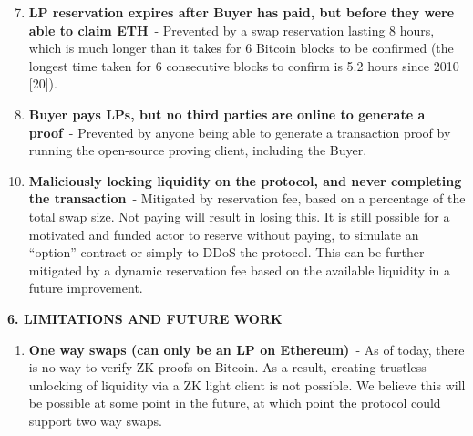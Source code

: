 \documentclass[
]{article}
\providecommand{\tightlist}{%
  \setlength{\itemsep}{0pt}\setlength{\parskip}{0pt}}
\begin{document}
{{\begin{enumerate}
\setcounter{enumi}{6}
\tightlist
\item
  \textbf{LP reservation expires after Buyer has paid, but before they were
  able to claim ETH}{~- Prevented by a swap reservation lasting 8 hours,
  which is much longer than it takes for 6 Bitcoin blocks to be
  confirmed (the longest time taken for 6 consecutive blocks to confirm
  is 5.2 hours since 2010 {[}20{]}). }
\end{enumerate}

{}

\begin{enumerate}
\setcounter{enumi}{7}
\tightlist
\item
  \textbf{Buyer pays LPs, but no third parties are online to generate a
  proof}{~- Prevented by anyone being able to generate a transaction
  proof by running the open-source proving client, including the Buyer.}
\end{enumerate}

{}

\begin{enumerate}
\setcounter{enumi}{9}
\tightlist
\item
  \textbf{Maliciously locking liquidity on the protocol, and never completing
  the transaction}{~- Mitigated by reservation fee, based on a
  percentage of the total swap size. Not paying will result in losing
  this. It is still possible for a motivated and funded actor to reserve
  without paying, to simulate an ``option'' contract or simply to DDoS
  the protocol. This can be further mitigated by a dynamic reservation
  fee based on the available liquidity in a future improvement.}
\end{enumerate}

{}


{}{}\vspace*{\baselineskip}
\begin{center}
\textbf{6. LIMITATIONS AND FUTURE WORK}
\end{center}

{}{}\vspace*{\baselineskip}

{}

\hspace*{3em}{There are several limitations and subsequent improvements that can be made to the protocol in future iterations:}
{}{}\vspace*{\baselineskip}

{}

\begin{enumerate}
\tightlist
\item
  \textbf{One way swaps (can only be an LP on Ethereum)}{~- As of today, there
  is no way to verify ZK proofs on Bitcoin. As a result, creating
  trustless unlocking of liquidity via a ZK light client is not
  possible. We believe this will be possible at some point in the
  future, at which point the protocol could support two way swaps.}
\end{enumerate}

}}
\end{document}

